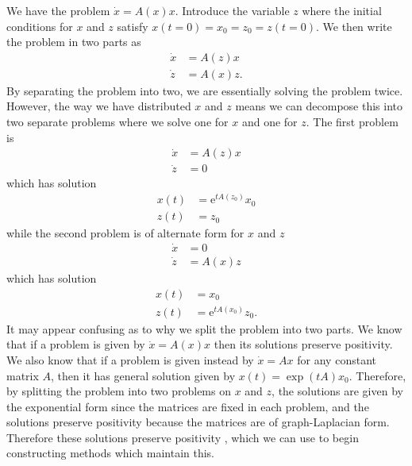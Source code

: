 We have the problem $\dot{x} = A(x)x$. Introduce the variable $z$ where the initial conditions for $x$ and $z$ satisfy $x(t=0) = x_0 = z_0 = z(t=0)$.
We then write the problem in two parts as
\begin{align*}
    \dot{x} &= A(z)x \\
    \dot{z} &= A(x)z.
\end{align*}
By separating the problem into two, we are essentially solving the problem twice.
However, the way we have distributed $x$ and $z$ means we can decompose this into two separate problems where we solve one for $x$ and one for $z$.
The first problem is
\begin{equation}
    \label{eqn:split1}
    \begin{aligned}
        \dot{x} &= A(z)x \\
        \dot{z} &= 0
    \end{aligned}
\end{equation}
which has solution
\begin{align*}
    x(t) &= \mathrm{e}^{tA(z_0)}x_0 \\
    z(t) &= z_0
\end{align*}
while the second problem is of alternate form for $x$ and $z$
\begin{equation}
    \label{eqn:split2}
    \begin{aligned}
        \dot{x} &= 0 \\
        \dot{z} &= A(x)z
    \end{aligned}
\end{equation}
which has solution
\begin{align*}
    x(t) &= x_0 \\
    z(t) &= \mathrm{e}^{tA(x_0)}z_0.
\end{align*}
It may appear confusing as to why we split the problem into two parts.
We know that if a problem is given by $\dot{x} = A(x)x$ then its solutions preserve positivity.
We also know that if a problem is given instead by $\dot{x} = Ax$ for any constant matrix $A$, then it has general solution given by $x(t) = \exp(tA)x_0$.
Therefore, by splitting the problem into two problems on $x$ and $z$,
the solutions are given by the exponential form since the matrices are fixed in each problem,
and the solutions preserve positivity because the matrices are of graph-Laplacian form.
Therefore these solutions preserve positivity \cite{blanes_pos_2022}, which we can use to begin constructing methods which maintain this.

